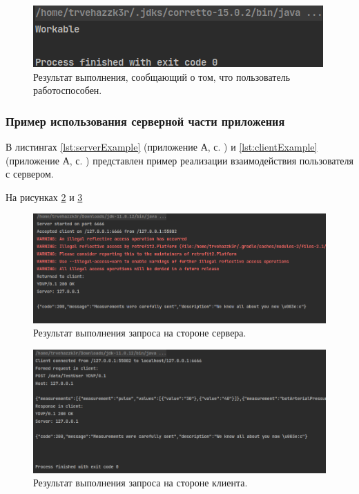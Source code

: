 \begin{figure}[H]
	\centering
	\includegraphics[width=\textwidth]{img/analyzeExample2.png}
	\caption{Результат выполнения, сообщающий о том, что пользователь работоспособен.}
	\label{fig:analyzeExample2}
\end{figure}

\subsubsection{Пример использования серверной части приложения}

В листингах \ref{lst:serverExample} (приложение А, с. \pageref{chp:application-a}) и \ref{lst:clientExample} (приложение А, с. \pageref{chp:application-a}) представлен пример реализации взаимодействия пользователя с сервером.

На рисунках \ref{fig:serverExample} и \ref{fig:clientExample}

\begin{figure}[H]
	\centering
	\includegraphics[width=\textwidth]{img/serverOutput.png}
	\caption{Результат выполнения запроса на стороне сервера.}
	\label{fig:serverExample}
\end{figure}

\begin{figure}[H]
	\centering
	\includegraphics[width=\textwidth]{img/clientOutput.png}
	\caption{Результат выполнения запроса на стороне клиента.}
	\label{fig:clientExample}
\end{figure}

